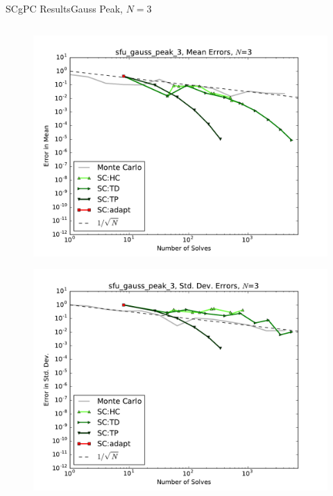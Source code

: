\documentclass{beamer}
\begin{document}
\begin{frame}{SCgPC Results}{Gauss Peak, $N=3$}
\begin{columns}
\begin{column}{0.5\textwidth}
\begin{figure}[h!]
          \includegraphics[width=0.8\linewidth]{anlmodels/sfu_gauss_peak_3_mean_errs_nohdmr}
        \end{figure}
        \vspace{-20pt}
        \begin{figure}[h!]
          \centering
          \includegraphics[width=0.8\linewidth]{anlmodels/sfu_gauss_peak_3_variance_errs_nohdmr}
        \end{figure}
   \end{column}
 \end{columns}
\end{frame}
\end{document}
